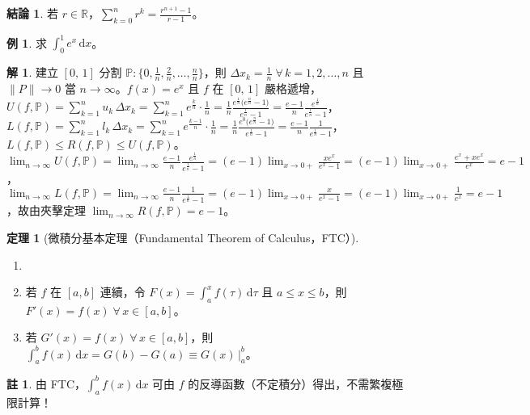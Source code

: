 \documentclass[12pt]{extarticle}
\newcommand{\ds}{\displaystyle}
\theoremstyle{definition}
\newtheorem*{fact}{結論}
\newtheorem*{thm}{定理}
\newtheorem*{ex}{例}
\newtheorem*{sol}{解}
\newtheorem*{rmk}{註}
\begin{document}
\begin{fact}
  若 $r\in\mathbb{R}$，$\ds\sum_{k = 0}^n r^k = \frac{r^{n+1} - 1}{r - 1}$。
\end{fact}

\begin{ex}
  求 $\ds\int_0^1 e^x\,\text{d}x$。
\end{ex}

\begin{sol}
  建立 $\ds [0,\,1]$ 分割 $\ds\mathbb{P}: \Big\{0, \frac{1}{n}, \frac{2}{n}, \ldots, \frac{n}{n}\Big\}$，則 $\ds\Delta x_k = \frac{1}{n}\;\forall\,k=1,2,\ldots,n$ 且 $\ds\|P\|\to 0$ 當 $n\to\infty$。$f(x) = e^x$ 且 $f$ 在 $[0,\,1]$ 嚴格遞增，$\ds U(f,\mathbb{P}) = \sum_{k=1}^n u_k\,\Delta x_k = \sum_{k=1}^n e^{\frac{k}{n}}\cdot\frac{1}{n} = \frac{1}{n}\frac{e^{\frac{1}{n}}\big(e^{\frac{n}{n}} - 1\big)}{e^{\frac{1}{n}} - 1} = \frac{e - 1}{n}\frac{e^{\frac{1}{n}}}{e^{\frac{1}{n}} - 1}$，$\ds L(f,\mathbb{P}) = \sum_{k=1}^n l_k\,\Delta x_k = \sum_{k=1}^n e^{\frac{k - 1}{n}}\cdot\frac{1}{n} = \frac{1}{n}\frac{e^0\big(e^{\frac{n}{n}} - 1\big)}{e^{\frac{1}{n}} - 1} = \frac{e - 1}{n}\frac{1}{e^{\frac{1}{n}} - 1}$，$\ds L(f,\mathbb{P})\leqslant R(f,\mathbb{P})\leqslant U(f, \mathbb{P})$。$\ds\lim_{n\to\infty} U(f,\mathbb{P}) = \lim_{n\to\infty}\frac{e - 1}{n}\frac{e^{\frac{1}{n}}}{e^{\frac{1}{n}} - 1} = (e - 1)\lim_{x\to 0+}\frac{x e^x}{e^x - 1} = (e - 1)\lim_{x\to 0+}\frac{e^x + x e^x}{e^x} = e - 1$，$\ds\lim_{n\to\infty} L(f,\mathbb{P}) = \lim_{n\to\infty}\frac{e - 1}{n}\frac{1}{e^{\frac{1}{n}} - 1} = (e - 1)\lim_{x\to 0+}\frac{x}{e^x - 1} = (e - 1)\lim_{x\to 0+}\frac{1}{e^x} = e - 1$，故由夾擊定理 $\ds\lim_{n\to\infty} R(f,\mathbb{P}) = e - 1$。
\end{sol}

\begin{thm}[微積分基本定理（Fundamental Theorem of Calculus，FTC）]
  \begin{enumerate}\setlength\itemsep{0em}
    \item[]
    \item 若 $f$ 在 $[a, b]$ 連續，令 $\ds F(x) = \int_a^x f(\tau)\,\mathrm{d}\tau$ 且 $a\leqslant x\leqslant b$，則 $\ds F'(x) = f(x)\;\forall\,x\in[a, b]$。
    \item 若 $\ds G'(x) = f(x)\;\forall\,x\in[a, b]$，則 $\ds\int_a^b f(x)\,\mathrm{d}x = G(b) - G(a) \equiv G(x)\,\Big|_a^b$。
  \end{enumerate}
\end{thm}
\begin{rmk}
  由 FTC，$\ds\int_a^b f(x)\,\mathrm{d}x$ 可由 $f$ 的反導函數（不定積分）得出，不需繁複極限計算！
\end{rmk}
\end{document}
